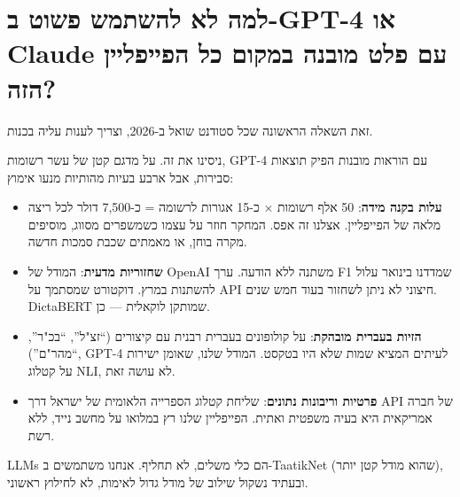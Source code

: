 \documentclass[12pt,a4paper]{article}
\begin{document}


\section{\texthebrew{למה לא להשתמש פשוט ב-GPT-4 או Claude עם פלט מובנה במקום כל הפייפליין הזה?}}
\begin{hebrew}
זאת השאלה הראשונה שכל סטודנט שואל ב-2026, וצריך לענות עליה בכנות.
\par
ניסינו את זה. על מדגם קטן של עשר רשומות, GPT-4 עם הוראות מובנות הפיק תוצאות סבירות, אבל ארבע בעיות מהותיות מנעו אימוץ:
\begin{itemize}
  \item \textbf{עלות בקנה מידה}: 50 אלף רשומות × כ-15 אגורות לרשומה = כ-7,500 דולר לכל ריצה מלאה של הפייפליין. אצלנו זה אפס. המחקר חוזר על עצמו כשמשפרים מסווג, מוסיפים מקרה בוחן, או מאמתים שכבת סמכות חדשה.
  \item \textbf{שחזוריות מדעית}: המודל של OpenAI משתנה ללא הודעה. ערך F1 שמדדנו בינואר עלול להשתנות במרץ. דוקטורט שמסתמך על API חיצוני לא ניתן לשחזור בעוד חמש שנים. DictaBERT שמותקן לוקאלית — כן.
  \item \textbf{הזיות בעברית מובהקת}: על קולופונים בעברית רבנית עם קיצורים (``זצ"ל'', ``בכ"ר'', ``מהר"ם''), GPT-4 לעיתים המציא שמות שלא היו בטקסט. המודל שלנו, שאומן ישירות על קטלוג NLI, לא עושה זאת.
  \item \textbf{פרטיות וריבונות נתונים}: שליחת קטלוג הספרייה הלאומית של ישראל דרך API של חברה אמריקאית היא בעיה משפטית ואתית. הפייפליין שלנו רץ במלואו על מחשב נייד, ללא רשת.
\end{itemize}
\par
LLMs הם כלי משלים, לא תחליף. אנחנו משתמשים ב-TaatikNet (שהוא מודל קטן יותר), ובעתיד נשקול שילוב של מודל גדול לאימות, לא לחילוץ ראשוני.
\end{hebrew}
\end{document}
